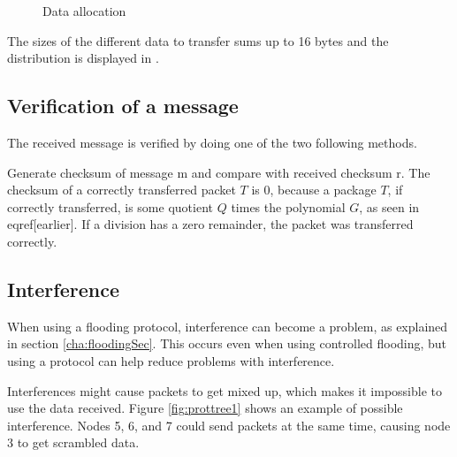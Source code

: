 \begin{figure}[h!]
	\centering
	\caption{Data allocation}
	\label{fig:dataalloc}
\end{figure}

The sizes of the different data to transfer sums up to 16 bytes and the distribution is displayed in .


\subsection{Verification of a message}
The received message is verified by doing one of the two following methods. 

Generate checksum of message m and compare with received checksum r.
The checksum of a correctly transferred packet $T$ is 0, because a package $T$, if correctly transferred, is some quotient $Q$ times the polynomial $G$, as seen in eqref[earlier]. If a division has a zero remainder, the packet was transferred correctly.


\subsection{Interference}
When using a flooding protocol, interference can become a problem, as explained in section \ref{cha:floodingSec}. This occurs even when using controlled flooding, but using a protocol can help reduce problems with interference.

Interferences might cause packets to get mixed up, which makes it impossible to use the data received. Figure \ref{fig:prottree1} shows an example of possible interference. Nodes 5, 6, and 7 could send packets at the same time, causing node 3 to get scrambled data.

